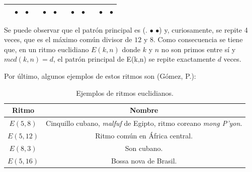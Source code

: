 \documentclass[a4paper, openright, 11pt, titlepage]{report}
\theoremstyle{definition}\newtheorem{defin}[propo]{Definition}
\theoremstyle{definition}\newtheorem{obser}[propo]{Remark}
\theoremstyle{definition}\newtheorem{ejem}[propo]{Ejemplo}
\theoremstyle{definition}\newtheorem{algoritmo}[propo]{Algoritmo}
\begin{document}
\begin{enumerate}
    \begin{table}[H]
        \centering
        \begin{tabular}{|c|c|c|c|c|c|c|c|c|c|c|c|}
        \hline
            & $\bullet$ & $\bullet$ & & $\bullet$ & $\bullet$ & & $\bullet$ & $\bullet$ & &$\bullet$ & $\bullet$\\
            \hline
        \end{tabular}
    \end{table}
    Se puede observar que el patrón principal es (\hspace{0.1cm}. \hspace{0.1cm} $\bullet$ \hspace{0.1cm} $\bullet$) y, curiosamente, se repite 4 veces, que es el máximo común divisor de $12$ y $8$. Como consecuencia se tiene que, en un ritmo euclidiano $E(k,n)$ donde $k$ y $n$ no son primos entre sí y $mcd(k,n) = d$, el patrón principal de E(k,n) se repite exactamente $d$ veces.
\end{enumerate}
Por último, algunos ejemplos de estos ritmos son \cite{ritmos} (Gómez, P.):
\begin{table}[H]
    \centering
    \begin{tabular}{|c|c|}
    \hline
      Ritmo   &  Nombre\\
      \hline \hline
      $E(5,8)$ & Cinquillo cubano, \textit{malfuf} de Egipto, ritmo coreano \textit{mong P'yon}.\\
      \hline
      $E(5,12)$ & Ritmo común en África central.\\
      \hline
      $E(8,3)$ & Son cubano.\\
      \hline
      $E(5, 16)$ & Bossa nova de Brasil.\\
      \hline
    \end{tabular}
    \caption{Ejemplos de ritmos euclidianos.}
\end{table}
\end{document}
